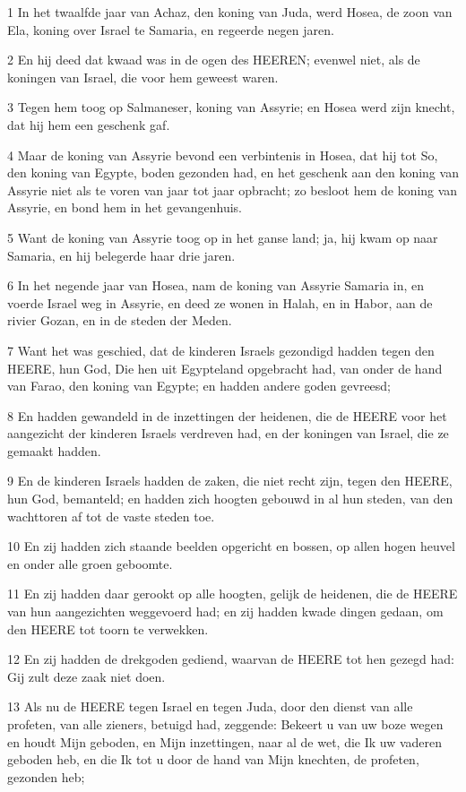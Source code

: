 \par 1 In het twaalfde jaar van Achaz, den koning van Juda, werd Hosea, de zoon van Ela, koning over Israel te Samaria, en regeerde negen jaren.
\par 2 En hij deed dat kwaad was in de ogen des HEEREN; evenwel niet, als de koningen van Israel, die voor hem geweest waren.
\par 3 Tegen hem toog op Salmaneser, koning van Assyrie; en Hosea werd zijn knecht, dat hij hem een geschenk gaf.
\par 4 Maar de koning van Assyrie bevond een verbintenis in Hosea, dat hij tot So, den koning van Egypte, boden gezonden had, en het geschenk aan den koning van Assyrie niet als te voren van jaar tot jaar opbracht; zo besloot hem de koning van Assyrie, en bond hem in het gevangenhuis.
\par 5 Want de koning van Assyrie toog op in het ganse land; ja, hij kwam op naar Samaria, en hij belegerde haar drie jaren.
\par 6 In het negende jaar van Hosea, nam de koning van Assyrie Samaria in, en voerde Israel weg in Assyrie, en deed ze wonen in Halah, en in Habor, aan de rivier Gozan, en in de steden der Meden.
\par 7 Want het was geschied, dat de kinderen Israels gezondigd hadden tegen den HEERE, hun God, Die hen uit Egypteland opgebracht had, van onder de hand van Farao, den koning van Egypte; en hadden andere goden gevreesd;
\par 8 En hadden gewandeld in de inzettingen der heidenen, die de HEERE voor het aangezicht der kinderen Israels verdreven had, en der koningen van Israel, die ze gemaakt hadden.
\par 9 En de kinderen Israels hadden de zaken, die niet recht zijn, tegen den HEERE, hun God, bemanteld; en hadden zich hoogten gebouwd in al hun steden, van den wachttoren af tot de vaste steden toe.
\par 10 En zij hadden zich staande beelden opgericht en bossen, op allen hogen heuvel en onder alle groen geboomte.
\par 11 En zij hadden daar gerookt op alle hoogten, gelijk de heidenen, die de HEERE van hun aangezichten weggevoerd had; en zij hadden kwade dingen gedaan, om den HEERE tot toorn te verwekken.
\par 12 En zij hadden de drekgoden gediend, waarvan de HEERE tot hen gezegd had: Gij zult deze zaak niet doen.
\par 13 Als nu de HEERE tegen Israel en tegen Juda, door den dienst van alle profeten, van alle zieners, betuigd had, zeggende: Bekeert u van uw boze wegen en houdt Mijn geboden, en Mijn inzettingen, naar al de wet, die Ik uw vaderen geboden heb, en die Ik tot u door de hand van Mijn knechten, de profeten, gezonden heb;
